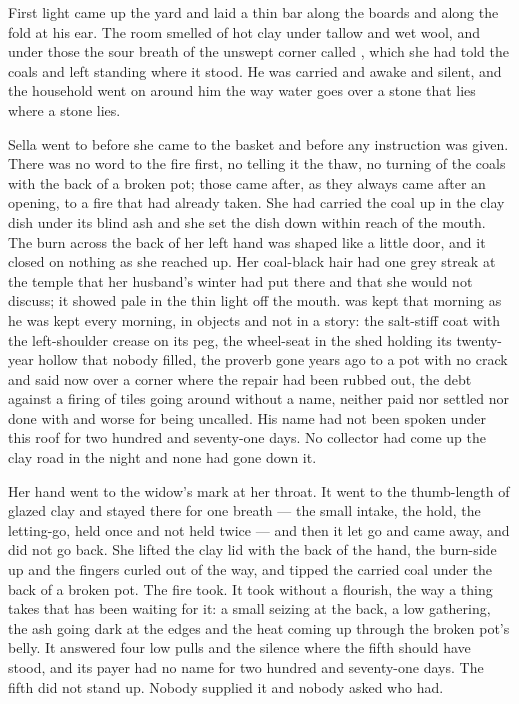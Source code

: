 \scenebreak

First light came up the yard and laid a thin bar along the boards and along the fold at his ear. The room smelled of hot clay under tallow and wet wool, and under those the sour breath of the unswept corner called , which she had told the coals and left standing where it stood. He was carried and awake and silent, and the household went on around him the way water goes over a stone that lies where a stone lies.

Sella went to  before she came to the basket and before any instruction was given. There was no word to the fire first, no telling it the thaw, no turning of the coals with the back of a broken pot; those came after, as they always came after an opening, to a fire that had already taken. She had carried the coal up in the clay dish under its blind ash and she set the dish down within reach of the mouth. The burn across the back of her left hand was shaped like a little door, and it closed on nothing as she reached up. Her coal-black hair had one grey streak at the temple that her husband's winter had put there and that she would not discuss; it showed pale in the thin light off the mouth.  was kept that morning as he was kept every morning, in objects and not in a story: the salt-stiff coat with the left-shoulder crease on its peg, the wheel-seat in the shed holding its twenty-year hollow that nobody filled, the proverb gone years ago to a pot with no crack and said now over a corner where the repair had been rubbed out, the debt against a firing of tiles going around without a name, neither paid nor settled nor done with and worse for being uncalled. His name had not been spoken under this roof for two hundred and seventy-one days. No collector had come up the clay road in the night and none had gone down it.

Her hand went to the widow's mark at her throat. It went to the thumb-length of glazed clay and stayed there for one breath --- the small intake, the hold, the letting-go, held once and not held twice --- and then it let go and came away, and did not go back. She lifted the clay lid with the back of the hand, the burn-side up and the fingers curled out of the way, and tipped the carried coal under the back of a broken pot. The fire took. It took without a flourish, the way a thing takes that has been waiting for it: a small seizing at the back, a low gathering, the ash going dark at the edges and the heat coming up through the broken pot's belly. It answered four low pulls and the silence where the fifth should have stood, and its payer had no name for two hundred and seventy-one days. The fifth did not stand up. Nobody supplied it and nobody asked who had.

